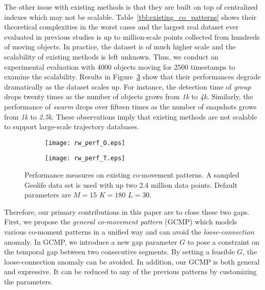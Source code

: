 The other issue with existing methods is that they are built on top of centralized indexes which may not be scalable. Table~\ref{tbl:existing_co_patterns} shows their theoretical complexities in the worst cases and the largest real dataset ever evaluated in previous studies is up to million-scale points collected from hundreds of moving objects. In practice, the dataset is of much higher scale and the scalability of existing methods is left unknown. Thus, we conduct an experimental evaluation with $4000$ objects moving for $2500$ timestamps to examine the scalability. Results in Figure~\ref{fig:related_work_scalability} show that their performances degrade dramatically as the dataset scales up. For instance, the detection time of \emph{group} drops twenty times as the number of objects grows from \emph{1k} to \emph{4k}. Similarly,
the performance of \emph{swarm} drops over fifteen times as the number of snapshots grows from \emph{1k} to \emph{2.5k}.
These observations imply that existing methods are not scalable to support large-scale trajectory databases. 

\begin{figure}[h]
    \centering
    \begin{subfigure}[b]{0.23\textwidth}
            \centering
            \texttt{[image: rw\_perf\_O.eps]}
    \label{fig:fig1}
    \end{subfigure}
    \begin{subfigure}[b]{0.23\textwidth}
            \centering
            \texttt{[image: rw\_perf\_T.eps]}
    \label{fig:fig2}
    \end{subfigure}
    \caption{Performance measures on existing co-movement patterns. A sampled Geolife data set
    is used with up two 2.4 million data points. Default parameters are $M=15$ $K=180$ $L=30$.}
    \label{fig:related_work_scalability}
\end{figure}




Therefore, our primary contributions in this paper are to close these two gaps. 
First, we propose the \emph{general co-movement pattern} (GCMP) which models
various co-moment patterns in a unified way and can avoid 
the \emph{loose-connection} anomaly. In GCMP, we introduce a new gap parameter $G$ to pose a constraint on the temporal gap between two consecutive segments. By setting a feasible $G$, the loose-connection anomaly can be avoided. In addition, our GCMP is both general and expressive. It can be reduced to any of the previous patterns by customizing the parameters.

